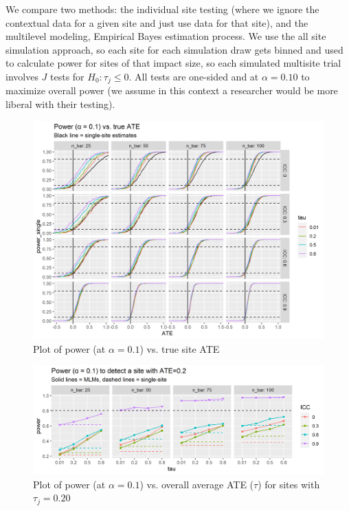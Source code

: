\documentclass[]{article}
\begin{document}
We compare two methods: the individual site testing (where we ignore the contextual data for a given site and just use data for that site), and the multilevel modeling, Empirical Bayes estimation process.
We use the all site simulation approach, so each site for each simulation draw gets binned and used to calculate power for sites of that impact size, so each simulated multisite trial involves $J$ tests for $H_0: \tau_j \leq 0$.
All tests are one-sided and at $\alpha=0.10$ to maximize overall power (we assume in this context a researcher would be more liberal with their testing).


\begin{figure}[ht]
	\centering
	\includegraphics[width=\textwidth]{power_plot_comp}
	\caption{Plot of power (at $\alpha = 0.1$) vs. true site ATE}
	\label{fig:power_plot}
\end{figure}


\begin{figure}[ht]
	\centering
	\includegraphics[width=\textwidth]{power_plot_comp_ATE02}
	\caption{Plot of power (at $\alpha = 0.1$) vs. overall average ATE ($\tau$) for sites with $\tau_j = 0.20$}
	\label{fig:power_plot_ATE02}
\end{figure}
\end{document}
